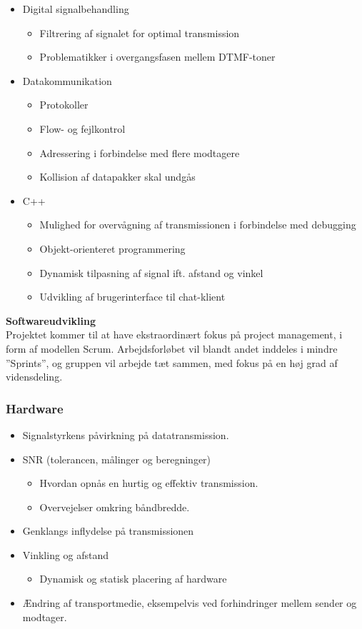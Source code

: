 \begin{itemize}[noitemsep]
  \item Digital signalbehandling
  \begin{itemize}[noitemsep]
    \item Filtrering af signalet for optimal transmission
    \item Problematikker i overgangsfasen mellem DTMF-toner
  \end{itemize}
  \item Datakommunikation
  \begin{itemize}[noitemsep]
    \item Protokoller
    \item Flow- og fejlkontrol
    \item Adressering i forbindelse med flere modtagere
    \item Kollision af datapakker skal undgås
  \end{itemize}
  \item C++
    \begin{itemize}[noitemsep]
    \item Mulighed for overvågning af transmissionen i forbindelse med debugging
    \item Objekt-orienteret programmering
    \item Dynamisk tilpasning af signal ift. afstand og vinkel
    \item Udvikling af brugerinterface til chat-klient
  \end{itemize}
\end{itemize}

\textbf{Softwareudvikling}\\
Projektet kommer til at have ekstraordinært fokus på project management, i form af modellen Scrum. Arbejdsforløbet vil blandt andet inddeles i mindre ”Sprints”, og gruppen vil arbejde tæt sammen, med fokus på en høj grad af vidensdeling.

\subsubsection{Hardware}

\begin{itemize}[noitemsep]
  \item Signalstyrkens påvirkning på datatransmission.
  \item SNR (tolerancen, målinger og beregninger)
  \begin{itemize}[noitemsep]
  \item Hvordan opnås en hurtig og effektiv transmission.
  \item Overvejelser omkring båndbredde.
  \end{itemize}
  \item Genklangs inflydelse på transmissionen
  \item Vinkling og afstand
  \begin{itemize}[noitemsep]
  \item Dynamisk og statisk placering af hardware
  \end{itemize}
  \item Ændring af transportmedie, eksempelvis ved forhindringer mellem sender og modtager.
\end{itemize}
